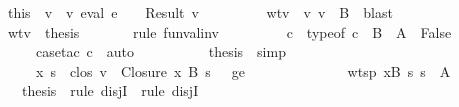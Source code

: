 \begin{isabellebody}
\ \ \ \ \ \ \isamarkupfalse \ this\ \isamarkupfalse \ v{}\ \ v{}{\isacharcolon}\ {\isachardoublequoteopen}eval\ e{}\ {\isasymrho}\ {\isasymmu}\ {\isacharequal}\ Result\ v{}{\isachardoublequoteclose}\isanewline
\ \ \ \ \ \ \ \ \ wtv{}{\isacharcolon}\ {\isachardoublequoteopen}{\isasymSigma}\ {\isasymturnstile}v\ v{}\ {\isacharcolon}\ B{\isachardoublequoteclose}\ \isamarkupfalse \ blast\isanewline
\ \ \ \ \ \ \isamarkupfalse \ wtv{}\ \isamarkupfalse \ {\isacharquery}thesis\isanewline
\ \ \ \ \ \ \isamarkupfalse \ {\isacharparenleft}rule\ funval{\isacharunderscore}inv{\isacharparenright}\isanewline
\ \ \ \ \ \ \ \ \isamarkupfalse \ c\ \isamarkupfalse \ {\isachardoublequoteopen}typeof\ c\ {\isacharequal}\ B\ {\isasymrightarrow}\ A{\isacharprime}{\isachardoublequoteclose}\ \isamarkupfalse \ {\isachardoublequoteopen}False{\isachardoublequoteclose}\isanewline
\ \ \ \ \ \ \ \ \ \ \isamarkupfalse \ {\isacharparenleft}case{\isacharunderscore}tac\ c{\isacharparenright}\ \isamarkupfalse \ auto\ \isamarkupfalse \isanewline
\ \ \ \ \ \ \ \ \isamarkupfalse \ {\isacharquery}thesis\ \isamarkupfalse \ simp\isanewline
\ \ \ \ \ \ \isamarkupfalse \isanewline
\ \ \ \ \ \ \ \ \isamarkupfalse \ {\isasymGamma}{\isacharprime}\ {\isasymrho}{\isacharprime}\ x\ s{\isacharprime}\ \isamarkupfalse \ clos{\isacharcolon}\ {\isachardoublequoteopen}v{}\ {\isacharequal}\ Closure\ x\ B\ s{\isacharprime}\ {\isasymrho}{\isacharprime}{\isachardoublequoteclose}\ \ ge{\isacharcolon}\ {\isachardoublequoteopen}{\isasymGamma}{\isacharprime}{\isacharsemicolon}{\isasymSigma}\ {\isasymturnstile}\ {\isasymrho}{\isacharprime}{\isachardoublequoteclose}\isanewline
\ \ \ \ \ \ \ \ \ \ \ wtsp{\isacharcolon}\ {\isachardoublequoteopen}{\isacharparenleft}x{\isacharcomma}B{\isacharparenright}{\isacharhash}{\isasymGamma}{\isacharprime}\ {\isasymturnstile}\isactrlisub s\ s{\isacharprime}\ {\isacharcolon}\ A{\isacharprime}{\isachardoublequoteclose}\isanewline
\ \ \ \ \ \ \ \ \isamarkupfalse \ {\isacharquery}thesis\ \isamarkupfalse \ {\isacharparenleft}rule\ disjI{}{\isacharparenright}\ \isamarkupfalse \ {\isacharparenleft}rule\ disjI{}{\isacharparenright}\isanewline

\end{isabellebody}
